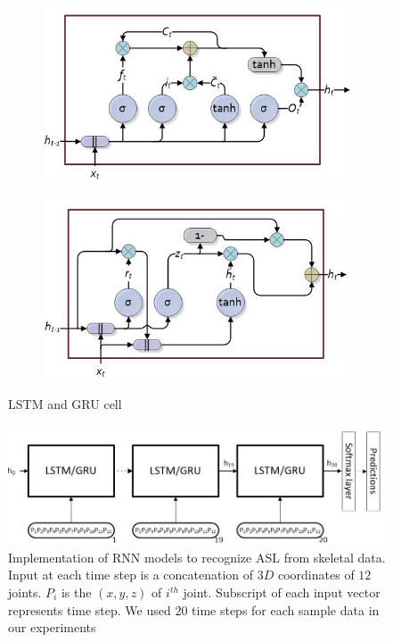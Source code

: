 \documentclass[10pt,twocolumn,letterpaper]{article}
\begin{document}
\begin{figure}[h]
	\begin{center}
		\begin{subfigure}{.45\textwidth}
			\includegraphics[width=\linewidth, height=.2\textheight]{lstm_cell2}
			\caption{}
			\label{fig:lstm_cell} 
		\end{subfigure}
		
		\begin{subfigure}{.45\textwidth}
			\includegraphics[width=\linewidth, height=.2\textheight]{gru_cell2}
			\caption{}
			\label{fig:gru_cell} 
		\end{subfigure}
	\end{center}
	\caption{LSTM and GRU cell}
	\label{fig:lstm_gru_cells}
\end{figure}
\begin{figure}[h]
	\begin{center}
		\includegraphics[width=.8\linewidth]{rnn_impl}
	\end{center}
	\caption{Implementation of RNN models to recognize ASL from skeletal data. Input at each time step is a concatenation of $3D$ coordinates of $12$ joints. $P_i$ is the $(x, y, z)$ of $i^{th}$ joint. Subscript of each input vector represents time step. We used $20$ time steps for each sample data in our experiments}
	\label{fig:rnn_impl}
\end{figure}
\end{document}
